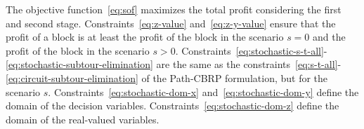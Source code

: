The objective function~\eqref{eq:sof} maximizes the total profit considering the first and second stage.
Constraints~\eqref{eq:z-value} and~\eqref{eq:z-y-value} ensure that the profit of a block is at least the profit of the block in the scenario $s = 0$ and the profit of the block in the scenario $s > 0$.
Constraints~\eqref{eq:stochastic-s-t-all}-\eqref{eq:stochastic-subtour-elimination} are the same as the constraints~\eqref{eq:s-t-all}-\eqref{eq:circuit-subtour-elimination} of the Path-CBRP formulation, but for the scenario $s$.
Constraints~\eqref{eq:stochastic-dom-x} and~\eqref{eq:stochastic-dom-y} define the domain of the decision variables.
Constraints~\eqref{eq:stochastic-dom-z} define the domain of the real-valued variables.









